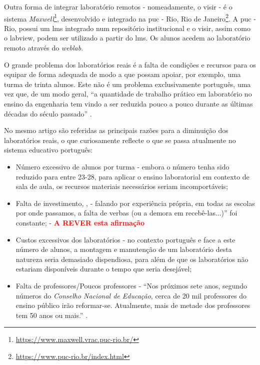 Outra forma de integrar \acrshort{laboratório remoto}s - nomeadamente, o \acrshort{visir} - é o sistema \textit{Maxwell}\footnote{\url{https://www.maxwell.vrac.puc-rio.br/}}, desenvolvido e integrado na \acrfull{puc} - Rio, Rio de Janeiro\footnote{\url{https://www.puc-rio.br/index.html}}. A \acrshort{puc} - Rio, possui um \acrshort{lms} integrado num repositório institucional e o \acrshort{visir}, assim como o \acrshort{labview}, podem ser utilizado a partir do \acrshort{lms}. Os alunos acedem ao \acrshort{laboratório remoto} através do \textit{weblab}\cite{Alves}.

O grande problema dos laboratórios reais é a falta de condições e recursos para os equipar de forma adequada de modo a que possam apoiar, por exemplo, uma turma de trinta alunos. Este não é um problema exclusivamente português, uma vez que, de um modo geral, ``a quantidade de trabalho prático em laboratório no ensino da engenharia tem vindo a ser reduzida pouco a pouco durante as últimas décadas do século passado'' \cite{PaperTit40:online}.

No mesmo artigo \cite{PaperTit40:online} são referidas as principais razões para a diminuição dos laboratórios reais, o que curiosamente reflecte o que se passa atualmente no sistema educativo português:

\begin{itemize}
    \item Número excessivo de alunos por turma \cite{Reduçãod55:online} - embora o número tenha sido reduzido para entre 23-28, para aplicar o ensino laboratorial em contexto de sala de aula, os recursos materiais necessários seriam incomportáveis;
    \item Falta de investimento\cite{Faltadei99:online}, \cite{Odesinve56:online}, \cite{EDUSTATP20:online} - falando por experiência própria, em todas as escolas por onde passamos, a falta de verbas (ou a demora em recebê-las...)'' foi constante; - \textcolor{red}{\textbf{A REVER esta afirmação}}
    \item Custos excessivos dos laboratórios - no contexto português e face a este número de alunos, a montagem e manutenção de um laboratório desta natureza seria demasiado dispendiosa, para além de que os laboratórios não estariam disponíveis durante o tempo que seria desejável;
    \item Falta de professores/Poucos professores - ``Nos próximos sete anos, segundo números do \textit{Conselho Nacional de Educação}, cerca de 20 mil professores do ensino público irão reformar-se. Atualmente, mais de metade dos professores tem 50 anos ou mais.'' \cite{Faltaded39:online}.
\end{itemize}

